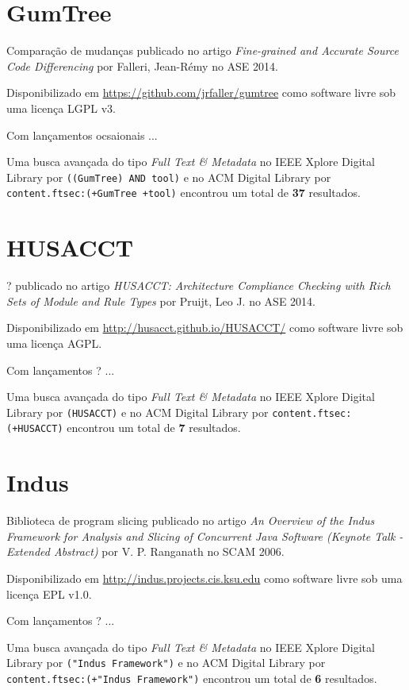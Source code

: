 \section{GumTree}

Comparação de mudanças
publicado no artigo {\it Fine-grained and Accurate Source Code Differencing}
por Falleri, Jean-R{\'e}my
no ASE 2014.

Disponibilizado em \url{https://github.com/jrfaller/gumtree}
como software livre
sob uma licença LGPL v3.

Com lançamentos ocsaionais ...


Uma busca avançada do tipo {\it Full Text \& Metadata} no IEEE Xplore Digital Library por
\texttt{((GumTree) AND tool)}
e no ACM Digital Library por
\texttt{content.ftsec:(+GumTree +tool)}
encontrou um total de
{\bf 37}
resultados.

\section{HUSACCT}

?
publicado no artigo {\it HUSACCT: Architecture Compliance Checking with Rich Sets of Module and Rule Types}
por Pruijt, Leo J.
no ASE 2014.

Disponibilizado em \url{http://husacct.github.io/HUSACCT/}
como software livre
sob uma licença AGPL.

Com lançamentos ? ...


Uma busca avançada do tipo {\it Full Text \& Metadata} no IEEE Xplore Digital Library por
\texttt{(HUSACCT)}
e no ACM Digital Library por
\texttt{content.ftsec:(+HUSACCT)}
encontrou um total de
{\bf 7}
resultados.

\section{Indus}

Biblioteca de program slicing
publicado no artigo {\it An Overview of the Indus Framework for Analysis and Slicing of Concurrent Java Software (Keynote Talk - Extended Abstract)}
por V. P. Ranganath
no SCAM 2006.

Disponibilizado em \url{http://indus.projects.cis.ksu.edu}
como software livre
sob uma licença EPL v1.0.

Com lançamentos ? ...


Uma busca avançada do tipo {\it Full Text \& Metadata} no IEEE Xplore Digital Library por
\texttt{("Indus Framework")}
e no ACM Digital Library por
\texttt{content.ftsec:(+"Indus Framework")}
encontrou um total de
{\bf 6}
resultados.


